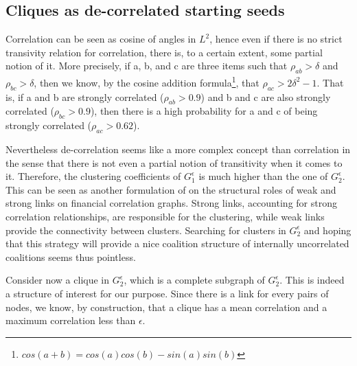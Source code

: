 \documentclass[conference]{IEEEtran}
\begin{document}
\subsection{Cliques as de-correlated starting seeds}
Correlation can be seen as cosine of angles in $ L^{2} $, hence even if there is no strict transivity relation for correlation, there is, to a certain extent, some partial notion of it. More precisely, if a, b, and c are three items such that $ \rho_{ab} > \delta $ and $ \rho_{bc} > \delta $, then we know, by the cosine addition formula\footnote{ $ cos(a+b) = cos(a)cos(b) - sin(a)sin(b) $ }, that $ \rho_{ac} > 2 \delta^{2} - 1 $. That is, if a and b are strongly correlated ($\rho_{ab} > 0.9 $) and b and c are also strongly correlated ($\rho_{bc} > 0.9 $), then there is a high probability for a and c of being strongly correlated ($\rho_{ac} > 0.62 $).

Nevertheless de-correlation seems like a more complex concept than correlation in the sense that there is not even a partial notion of transitivity when it comes to it. Therefore, the clustering coefficients of $ G_{1}^{\epsilon} $ is much higher than the one of $ G_{2}^{\epsilon} $. This can be seen as another formulation of \cite{Garas2008} on the structural roles of weak and strong links on financial correlation graphs. Strong links, accounting for strong correlation relationships, are responsible for the clustering, while weak links provide the connectivity between clusters. Searching for clusters in $ G_{2}^{\epsilon} $ and hoping that this strategy will provide a nice coalition structure of internally uncorrelated coalitions seems thus pointless.

Consider now a clique in  $ G_{2}^{\epsilon} $, which is a complete subgraph of $ G_{2}^{\epsilon} $. This is indeed a structure of interest for our purpose. Since there is a link for every pairs of nodes, we know, by construction, that a clique has a mean correlation and a maximum correlation less than $ \epsilon $. 
\end{document}
